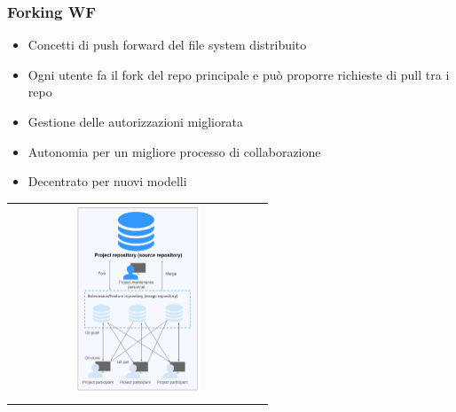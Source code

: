 \newpage
\subsubsection{Forking WF}
\begin{itemize}
    \item Concetti di push forward del file system distribuito
    \item Ogni utente fa il fork del repo principale e può proporre richieste di pull tra i repo
    \item Gestione delle autorizzazioni migliorata
    \item Autonomia per un migliore processo di collaborazione
    \item Decentrato per nuovi modelli
\end{itemize}
\begin{center}
    \begin{tabular}{c}
        \\ \includegraphics[width=0.5\textwidth]{images/VCS6.png} \\ \\
    \end{tabular}
\end{center}

